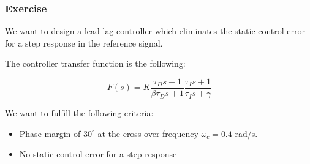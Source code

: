 \subsubsection{Exercise}

We want to design a lead-lag controller which eliminates the static control error for a step response in the reference signal.

The controller transfer function is the following:

$$ F(s) = K \frac{\tau_D s + 1}{\beta \tau_D s + 1} \frac{\tau_I s + 1}{\tau_I s + \gamma}$$

We want to fulfill the following criteria:
\begin{itemize}
 \item Phase margin of $30^{\circ}$ at the cross-over frequency $\omega_c = 0.4$ rad/s.
 \item No static control error for a step response 
\end{itemize}
